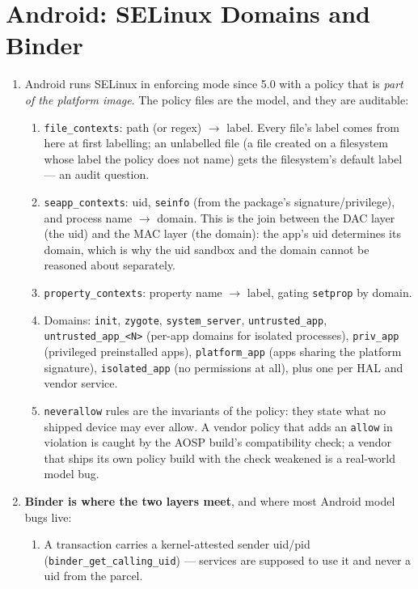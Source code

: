\documentclass[12pt]{Training}
\begin{document}
\section*{Android: SELinux Domains and Binder}
\begin{enumerate}
    \item Android runs SELinux in enforcing mode since 5.0 with a policy that is \emph{part of the platform image}. The policy files are the model, and they are auditable:
    \begin{enumerate}
        \item \lstinline{file_contexts}: path (or regex) $\to$ label. Every file's label comes from here at first labelling; an unlabelled file (a file created on a filesystem whose label the policy does not name) gets the filesystem's default label --- an audit question.
        \item \lstinline{seapp_contexts}: uid, \lstinline{seinfo} (from the package's signature/privilege), and process name $\to$ domain. This is the join between the DAC layer (the uid) and the MAC layer (the domain): the app's uid determines its domain, which is why the uid sandbox and the domain cannot be reasoned about separately.
        \item \lstinline{property_contexts}: property name $\to$ label, gating \lstinline{setprop} by domain.
        \item Domains: \lstinline{init}, \lstinline{zygote}, \lstinline{system_server}, \lstinline{untrusted_app}, \lstinline{untrusted_app_<N>} (per-app domains for isolated processes), \lstinline{priv_app} (privileged preinstalled apps), \lstinline{platform_app} (apps sharing the platform signature), \lstinline{isolated_app} (no permissions at all), plus one per HAL and vendor service.
        \item \lstinline{neverallow} rules are the invariants of the policy: they state what no shipped device may ever allow. A vendor policy that adds an \lstinline{allow} in violation is caught by the AOSP build's compatibility check; a vendor that ships its own policy build with the check weakened is a real-world model bug.
    \end{enumerate}
    \item \textbf{Binder is where the two layers meet}, and where most Android model bugs live:
    \begin{enumerate}
        \item A transaction carries a kernel-attested sender uid/pid (\lstinline{binder_get_calling_uid}) --- services are supposed to use it and never a uid from the parcel.

\end{enumerate}
\end{enumerate}
\end{document}
